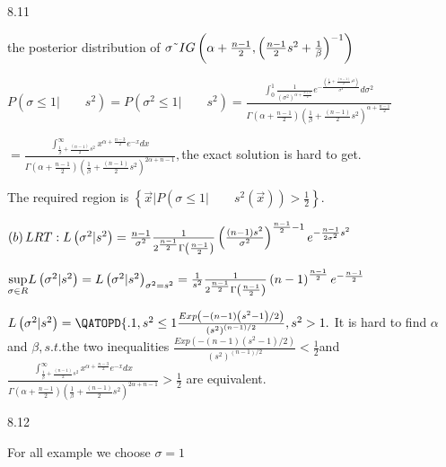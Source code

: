 \documentclass{article}
\begin{document}
8.11

the posterior distribution of $\sigma \symbol{126}IG\left( \alpha +\frac{n-1%
}{2},\left( \frac{n-1}{2}s^{2}+\frac{1}{\beta }\right) ^{-1}\right) $

\bigskip $P\left( \sigma \leq 1|\qquad s^{2}\right) =P\left( \sigma ^{2}\leq
1|\qquad s^{2}\right) =\frac{\int_{0}^{1}\frac{1}{\left( \sigma ^{2}\right)
^{\alpha +\frac{n+1}{2}}}e^{-\frac{\left( \frac{1}{\beta }+\frac{\left(
n-1\right) }{2}s^{2}\right) }{\sigma ^{2}}}d\sigma ^{2}}{\Gamma \left(
\alpha +\frac{n-1}{2}\right) \left( \frac{1}{\beta }+\frac{\left( n-1\right) 
}{2}s^{2}\right) ^{\alpha +\frac{n-1}{2}}}$

$=\frac{\int_{\frac{1}{\beta }+\frac{\left( n-1\right) }{2}s^{2}}^{\infty
}x^{\alpha +\frac{n-3}{2}}e^{-x}dx}{\Gamma \left( \alpha +\frac{n-1}{2}%
\right) \left( \frac{1}{\beta }+\frac{\left( n-1\right) }{2}s^{2}\right)
^{2\alpha +n-1}},$the exact solution is hard to get.

The required region is $\left\{ \vec{x}|P\left( \sigma \leq 1|\qquad
s^{2}\left( \vec{x}\right) \right) >\frac{1}{2}\right\} .$

$\left( b\right) LRT:L\left( \sigma ^{2}|s^{2}\right) =\frac{n-1}{\sigma ^{2}%
}\frac{1}{2^{\frac{n-1}{2}}\Gamma \left( \frac{n-1}{2}\right) }\left( \frac{%
\left( n-1\right) s^{2}}{\sigma ^{2}}\right) ^{\frac{n-1}{2}-1}e^{-\frac{n-1%
}{2\sigma ^{2}}s^{2}}$

$\underset{\sigma \in R}{\sup }L\left( \sigma ^{2}|s^{2}\right) =L\left(
\sigma ^{2}|s^{2}\right) _{\sigma ^{2}=s^{2}}=\frac{1}{s^{2}}\frac{1}{2^{%
\frac{n-1}{2}}\Gamma \left( \frac{n-1}{2}\right) }\left( n-1\right) ^{\frac{%
n-1}{2}}e^{-\frac{n-1}{2}}$

$L\left( \sigma ^{2}|s^{2}\right) =\QATOPD\{ . {1,s^{2}\leq 1}{\frac{%
Exp\left( -\left( n-1\right) \left( s^{2}-1\right) /2\right) }{\left(
s^{2}\right) ^{\left( n-1\right) /2}},s^{2}>1}.$ It is hard to find $\alpha $
and $\beta ,s.t.$the two inequalities $\frac{Exp\left( -\left( n-1\right)
\left( s^{2}-1\right) /2\right) }{\left( s^{2}\right) ^{\left( n-1\right) /2}%
}<\frac{1}{2}$and $\frac{\int_{\frac{1}{\beta }+\frac{\left( n-1\right) }{2}%
s^{2}}^{\infty }x^{\alpha +\frac{n-3}{2}}e^{-x}dx}{\Gamma \left( \alpha +%
\frac{n-1}{2}\right) \left( \frac{1}{\beta }+\frac{\left( n-1\right) }{2}%
s^{2}\right) ^{2\alpha +n-1}}>\frac{1}{2}$ are equivalent. 

\bigskip 

8.12

For all example we choose $\sigma =1$
\end{document}
